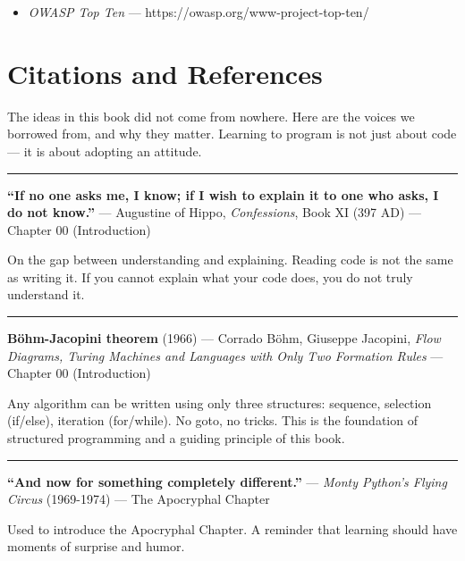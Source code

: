 \documentclass[11pt,a4paper,oneside]{book}
\providecommand{\tightlist}{%
  \setlength{\itemsep}{0pt}\setlength{\parskip}{0pt}}
\begin{document}
\begin{itemize}
\tightlist
\item
  \emph{OWASP Top Ten} --- https://owasp.org/www-project-top-ten/
\end{itemize}

\newpage

\hypertarget{citations-and-references}{%
\chapter{Citations and
References}\label{citations-and-references}}

The ideas in this book did not come from nowhere. Here are the
voices we borrowed from, and why they matter. Learning to program
is not just about code --- it is about adopting an attitude.

\begin{center}\rule{0.5\linewidth}{0.5pt}\end{center}

\textbf{``If no one asks me, I know; if I wish to explain it to
one who asks, I do not know.''} --- Augustine of Hippo,
\emph{Confessions}, Book XI (397 AD) --- Chapter 00
(Introduction)

On the gap between understanding and explaining. Reading code is
not the same as writing it. If you cannot explain what your code
does, you do not truly understand it.

\begin{center}\rule{0.5\linewidth}{0.5pt}\end{center}

\textbf{Böhm-Jacopini theorem} (1966) --- Corrado Böhm, Giuseppe
Jacopini, \emph{Flow Diagrams, Turing Machines and Languages with
Only Two Formation Rules} --- Chapter 00 (Introduction)

Any algorithm can be written using only three structures:
sequence, selection (if/else), iteration (for/while). No goto, no
tricks. This is the foundation of structured programming and a
guiding principle of this book.

\begin{center}\rule{0.5\linewidth}{0.5pt}\end{center}

\textbf{``And now for something completely different.''} ---
\emph{Monty Python's Flying Circus} (1969-1974) --- The
Apocryphal Chapter

Used to introduce the Apocryphal Chapter. A reminder that
learning should have moments of surprise and humor.
\end{document}
